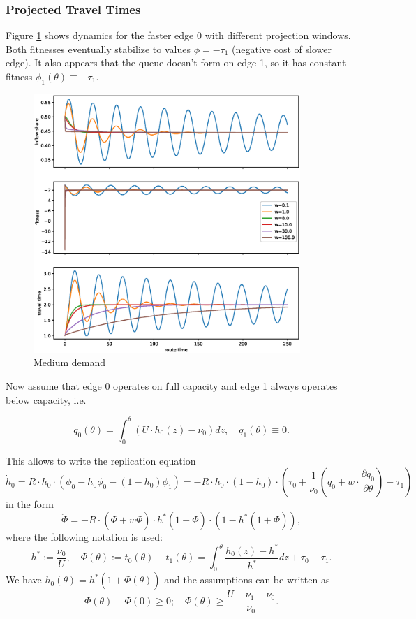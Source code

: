 \documentclass[12pt]{article}
\begin{document}
\subsubsection*{Projected Travel Times}

Figure \ref{fig:replicator_medium_demand} shows dynamics for the faster edge 0 with different projection windows. 
Both fitnesses eventually stabilize to values $\phi = -\tau_1$ (negative cost of slower edge).
It also appears that the queue doesn't form on edge 1, so it has constant fitness $\phi_1(\theta) \equiv - \tau_1 $.

\begin{figure}
	\includegraphics[width=0.9\textwidth]{img/replicator_medium_demand.eps}
	\caption{ Medium demand }
	\label{fig:replicator_medium_demand}

\end{figure}

Now assume that edge 0 operates on full capacity and  edge 1 always operates below capacity, i.e.

$$q_0(\theta) = \int_0^\theta (U\cdot h_0(z) - \nu_0) dz, \quad
 q_1(\theta) \equiv 0 .$$

This  allows to write the replication equation
$$ \dot{h}_0 = R \cdot h_0 \cdot (\phi_0 - h_0\phi_0 - (1-h_0)\phi_1) = -R \cdot h_0 \cdot ( 1- h_0 ) \cdot \left( \tau_0 + \frac{1}{\nu_0} (q_0 + w \cdot \frac{\partial q_0}{\partial \theta}) - \tau_1 \right) $$
in the form
$$ \ddot{\Phi} = - R \cdot (\Phi + w \dot{\Phi}) \cdot  h^* (1+ \dot{\Phi}) \cdot (1 -  h^* (1+ \dot{\Phi})),$$
 where the following notation is used: 
 $$h^* := \frac{\nu_0}{U}, \quad \Phi(\theta) := t_0(\theta) - t_1(\theta) = \int_0^{\theta} \frac{h_0(z) - h^*}{h^*} dz + \tau_0  - \tau_1 .$$
  We have $ h_0(\theta) = h^* (1 + \dot{\Phi}(\theta))$ and the assumptions can be written as 
 $$\Phi(\theta) - \Phi(0) \geq 0; \quad \dot{\Phi}(\theta) \geq \frac{U - \nu_1 - \nu_0}{\nu_0} .$$
\end{document}
